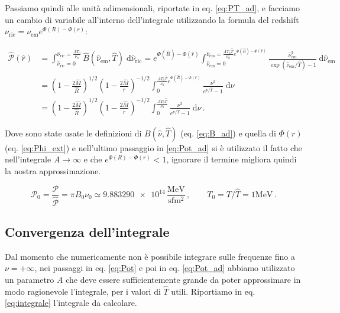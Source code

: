 \documentclass[a4paper, titlepage]{article}
\begin{document}
Passiamo quindi alle unità adimensionali, riportate in eq. \ref{eq:PT_ad}, e
facciamo un cambio di variabile all'interno dell'integrale utilizzando la
formula del redshift $\nu_\text{ric} = \nu_\text{em} e^{\Phi(R) - \Phi(r)}$:

\begin{align}
    \hat{\mathcal P}(\hat r)
    &= \int_{\hat \nu_\text{ric} = 0}^{\hat \nu_\text{ric} = \frac{A T_0}{\nu_0}}
    \hat B (\hat \nu_\text{em}, \hat T) \; \mathrm{d} \hat \nu_\text{ric}
    = e^{\Phi(\hat R) - \Phi(\hat r)}
    \int_{\hat \nu_\text{em} = 0}^{\hat \nu_\text{em} = \frac{A T_0 \hat T}{\nu_0} e^{\Phi(\hat R) - \Phi(\hat r)}}
    \frac{\hat \nu_{em}^3}{\exp(\hat \nu_\text{em} / \hat T) - 1} \; \mathrm{d}\hat \nu_\text{em} \\
    &= \left(1 - \frac{2 \hat M}{\hat R} \right)^{1/2}
    \left(1 - \frac{2 \hat M}{\hat r} \right)^{-1/2}
    \int_0^{\frac{A T_0 \hat T}{\nu_0} e^{\Phi(\hat R) - \Phi(\hat r)}}
    \frac{\nu^3}{e^{\nu / \hat T} - 1} \; \mathrm{d} \nu \\
    &= \left(1 - \frac{2 \hat M}{\hat R} \right)^{1/2}
    \left(1 - \frac{2 \hat M}{\hat r} \right)^{-1/2}
    \int_0^{\frac{A T_0 \hat T}{\nu_0}} \frac{\nu^3}{e^{\nu / \hat T} - 1} \;
    \mathrm{d} \nu \, .
    \label{eq:Pot_ad}
\end{align}

Dove sono state usate le definizioni di $B(\hat \nu, \hat T)$ (eq.
\ref{eq:B_ad}) e quella di $\Phi (r)$ (eq. \ref{eq:Phi_ext}) e nell'ultimo
passaggio in \ref{eq:Pot_ad} si è utilizzato il fatto che nell'integrale
$A \to \infty$ e che $e^{\Phi(R) - \Phi(r)} < 1$, ignorare il termine migliora
quindi la nostra approssimazione.

\begin{equation}
    \mathcal P_0 = \frac{\mathcal P}{\hat {\mathcal P}}
    = \pi B_0 \nu_0 \simeq \num{9.883290e+14} \,
    \frac{\unit{\mega\electronvolt}}{\unit{\second\femto\meter\squared}} \, ,
    \quad \quad
    T_0 = T / \hat T = 1 \unit{\mega\electronvolt} \, .
    \label{eq:PT_ad}
\end{equation}


\subsection{Convergenza dell'integrale}
Dal momento che numericamente non è possibile integrare sulle frequenze fino a
$\nu = + \infty$, nei passaggi in eq. \ref{eq:Pot} e poi in eq. \ref{eq:Pot_ad}
abbiamo utilizzato un parametro $A$ che deve essere sufficientemente grande da
poter approssimare in modo ragionevole l'integrale, per i valori di $\hat T$
utili.
Riportiamo in eq. \ref{eq:integrale} l'integrale da calcolare.
\end{document}
